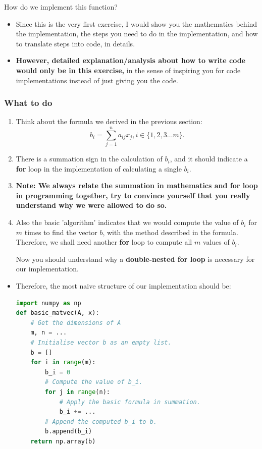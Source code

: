 \smallskip
\noindent How do we implement this function? 

\begin{itemize}
  \item Since this is the very first exercise, I would show you the mathematics behind the implementation, the steps you need to do in the implementation, and how to translate steps into code, in details. 
  \item \textbf{However, detailed explanation/analysis about how to write code would only be in this exercise, }in the sense of inspiring you for code implementations instead of just giving you the code.
\end{itemize}
\subsubsection*{What to do}
\begin{enumerate}
    \item Think about the formula we derived in the previous section:
    \[
    b_i = \sum_{j = 1}^{n} a_{ij} x_j, i \in \{1, 2, 3 \ldots m\}
    .\] 
  \item There is a summation sign in the calculation of $b_i$, and it should indicate a \textbf{for} loop in the implementation of calculating a single $b_i$.
  \item \textbf{Note: We always relate the summation in mathematics and for loop in programming together, try to convince yourself that you really understand why we were allowed to do so.}
  \item Also the basic 'algorithm' indicates that we would compute the value of $b_i$ for $m$ times to find the vector \(b\), with the method described in the formula. Therefore, we shall need another \textbf{for} loop to compute all $m$ values of $b_i$. 
  
  Now you should understand why a \textbf{double-nested for loop} is necessary for our implementation.
\end{enumerate}
\newpage
\begin{itemize}
   \item Therefore, the most naive structure of our implementation should be:
\begin{lstlisting}[language=Python]
import numpy as np
def basic_matvec(A, x):
    # Get the dimensions of A
    m, n = ...
    # Initialise vector b as an empty list.
    b = []
    for i in range(m):
        b_i = 0
        # Compute the value of b_i.
        for j in range(n):
            # Apply the basic formula in summation.
            b_i += ...
        # Append the computed b_i to b.
        b.append(b_i)
    return np.array(b)
\end{lstlisting}
\end{itemize}
